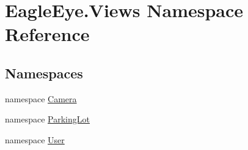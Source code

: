 \hypertarget{namespace_eagle_eye_1_1_views}{}\section{Eagle\+Eye.\+Views Namespace Reference}
\label{namespace_eagle_eye_1_1_views}
\subsection*{Namespaces}
\begin{DoxyCompactItemize}
\item 
namespace \mbox{\hyperlink{namespace_eagle_eye_1_1_views_1_1_camera}{Camera}}
\item 
namespace \mbox{\hyperlink{namespace_eagle_eye_1_1_views_1_1_parking_lot}{Parking\+Lot}}
\item 
namespace \mbox{\hyperlink{namespace_eagle_eye_1_1_views_1_1_user}{User}}
\end{DoxyCompactItemize}
